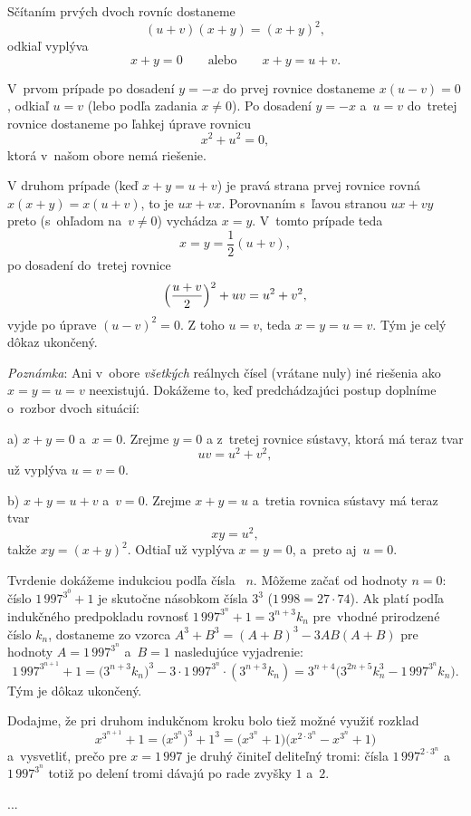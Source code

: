 {%
Sčítaním prvých dvoch rovníc dostaneme
$$
(u+v)(x+y)=(x+y)^2,
$$
odkiaľ vyplýva
$$x+y=0
\qquad \text{alebo} \qquad
x+y=u+v.
$$

V~prvom prípade po dosadení $y=-x$ do prvej rovnice dostaneme $x(u-v)=0$,
odkiaľ $u=v$ (lebo podľa zadania $x\ne0$).
Po dosadení $y=-x$ a~$u=v$
do~tretej rovnice dostaneme po ľahkej úprave rovnicu
$$x^2+u^2=0,$$
ktorá v~našom obore nemá riešenie.

V druhom prípade (keď $x+y=u+v$) je pravá strana prvej
rovnice rovná $x(x+y)=x(u+v)$, to je $ux+vx$.
Porovnaním
s~ľavou stranou $ux+vy$  preto (s~ohľadom na~$v\ne0$) vychádza $x=y$.
V~tomto prípade teda
$$x=y=\frac12(u+v),$$
po dosadení do~tretej rovnice
$$
\Bigl(\dfrac{u+v}{2}\Bigr)^2+uv=u^2+v^2,
$$
vyjde po úprave $(u-v)^2=0$. Z toho $u=v$, teda $x=y=u=v$.
Tým je celý dôkaz ukončený.

{\it Poznámka}: Ani v~obore {\it všetkých\/} %
reálnych čísel (vrátane nuly)
iné riešenia ako $x=y=u=v$ neexistujú. Dokážeme to,
keď predchádzajúci postup doplníme o~rozbor dvoch situácií:

a) $x+y=0$ a~$x=0$. Zrejme $y=0$ a z~tretej rovnice sústavy, ktorá
má teraz tvar
$$uv=u^2+v^2,$$
už vyplýva $u=v=0$.

b) $x+y=u+v$ a~$v=0$. Zrejme $x+y=u$ a~tretia rovnica sústavy má
teraz tvar
$$xy=u^2,$$
takže $xy=(x+y)^2$. Odtiaľ už vyplýva $x=y=0$,
a~preto aj~$u=0$.
}

{%
Tvrdenie dokážeme indukciou podľa čísla~ $n$. Môžeme
začať od hodnoty $n=0$: číslo $1\,997^{3^0}+1$ je skutočne násobkom
čísla $3^3$ ($1\,998=27\cdot74$). Ak platí podľa indukčného
predpokladu rovnosť $1\,997^{3^n}+1=3^{n+3}k_n$ pre~vhodné prirodzené
číslo $k_n$, dostaneme zo vzorca $A^3+B^3=(A+B)^3-3AB(A+B)$ pre
hodnoty $A=1\,997^{3^n}$ a~$B=1$ nasledujúce vyjadrenie:
$$
1\,997^{3^{n+1}}+1=\bigl(3^{n+3}k_n\bigr)^3-
3\cdot1\,997^{3^n}\cdot(3^{n+3}k_n)=
3^{n+4}\bigl(3^{2n+5}k_n^3-1\,997^{3^n}k_n\bigr).
$$
Tým je dôkaz ukončený.

Dodajme, že pri druhom indukčnom kroku bolo tiež možné
využiť rozklad
$$
x^{3^{n+1}}+1=\bigl(x^{3^n}\bigr)^3+1^3=\bigl(x^{3^n}+1\bigr)
                              \bigl(x^{2\cdot3^n}-x^{3^n}+1\bigr)
$$
a~vysvetliť, prečo pre $x=1\,997$ je druhý činiteľ deliteľný tromi:
čísla $1\,997^{2\cdot3^n}$ a~$1\,997^{3^n}$ totiž po delení tromi
dávajú po rade zvyšky $1$ a~$2$.
}

{%
...}

